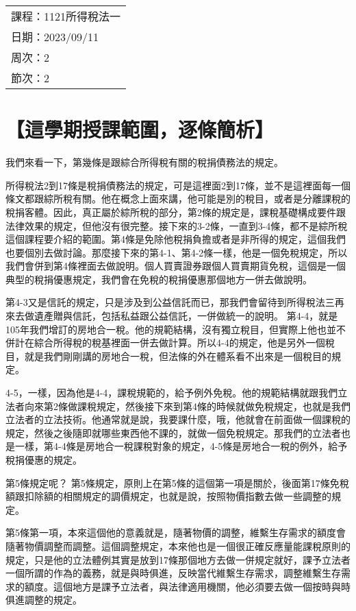 \documentclass[]{ctexbook}
\begin{document}
\begin{longtable}[]{@{}l@{}}
\toprule()
\endhead
課程：1121所得稅法一 \\
日期：2023/09/11 \\
周次：2 \\
節次：2 \\
\bottomrule()
\end{longtable}

\hypertarget{ux9019ux5b78ux671fux6388ux8ab2ux7bc4ux570dux9010ux689dux7c21ux6790}{%
\section{【這學期授課範圍，逐條簡析】}\label{ux9019ux5b78ux671fux6388ux8ab2ux7bc4ux570dux9010ux689dux7c21ux6790}}

我們來看一下，第幾條是跟綜合所得稅有關的稅捐債務法的規定。

所得稅法2到17條是稅捐債務法的規定，可是這裡面2到17條，並不是這裡面每一個條文都跟綜所稅有關。他在概念上面來講，他可能是別的稅目，或者是分離課稅的稅捐客體。因此，真正屬於綜所稅的部分，第2條的規定是，課稅基礎構成要件跟法律效果的規定，但他沒有很完整。接下來的3-2條，一直到3-4條，都不是綜所稅這個課程要介紹的範圍。第4條是免除他稅捐負擔或者是非所得的規定，這個我們也要個別去做討論。那麼接下來的第4-1、第4-2條一樣，他是一個免稅規定，所以我們會併到第4條裡面去做說明。個人買賣證券跟個人買賣期貨免稅，這個是一個典型的稅捐優惠規定，我們會在免稅的稅捐優惠那個地方一併去做說明。

第4-3又是信託的規定，只是涉及到公益信託而已，那我們會留待到所得稅法三再來去做遺產贈與信託，包括私益跟公益信託，一併做統一的說明。
第4-4，就是105年我們增訂的房地合一稅。他的規範結構，沒有獨立稅目，但實際上他也並不併計在綜合所得稅的稅基裡面一併去做計算。所以4-4的規定，他是另外一個稅目，就是我們剛剛講的房地合一稅，但法條的外在體系看不出來是一個稅目的規定。

4-5，一樣，因為他是4-4，課稅規範的，給予例外免稅。他的規範結構就跟我們立法者向來第2條做課稅規定，然後接下來到第4條的時候就做免稅規定，也就是我們立法者的立法技術。他通常就是說，我要課什麼，哦，他就會在前面做一個課稅的規定，然後之後隨即就哪些東西他不課的，就做一個免稅規定。那我們的立法者也是一樣，第4-4條是房地合一稅課稅對象的規定，4-5條是房地合一稅的例外，給予稅捐優惠的規定。

第5條規定呢？ 第5條規定，原則上在第5條的這個第一項是關於，後面第17條免稅額跟扣除額的相關規定的調價規定，也就是說，按照物價指數去做一些調整的規定。

第5條第一項，本來這個他的意義就是，隨著物價的調整，維繫生存需求的額度會隨著物價調整而調整。這個調整規定，本來他也是一個很正確反應量能課稅原則的規定，只是他的立法體例其實是放到17條那個地方去做一併規定就好，課予立法者一個所謂的作為的義務，就是與時俱進，反映當代維繫生存需求，調整維繫生存需求的額度。這個地方是課予立法者，與法律適用機關，他必須要去做一個按時與時俱進調整的規定。
\end{document}
